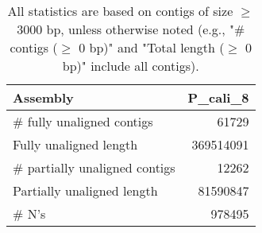 \documentclass[12pt,a4paper]{article}
\begin{document}
\begin{table}[ht]
\begin{center}
\caption{All statistics are based on contigs of size $\geq$ 3000 bp, unless otherwise noted (e.g., "\# contigs ($\geq$ 0 bp)" and "Total length ($\geq$ 0 bp)" include all contigs).}
\begin{tabular}{|l*{1}{|r}|}
\hline
Assembly & P\_cali\_8 \\ \hline
\# fully unaligned contigs & 61729 \\ \hline
Fully unaligned length & 369514091 \\ \hline
\# partially unaligned contigs & 12262 \\ \hline
Partially unaligned length & 81590847 \\ \hline
\# N's & 978495 \\ \hline
\end{tabular}
\end{center}
\end{table}
\end{document}
